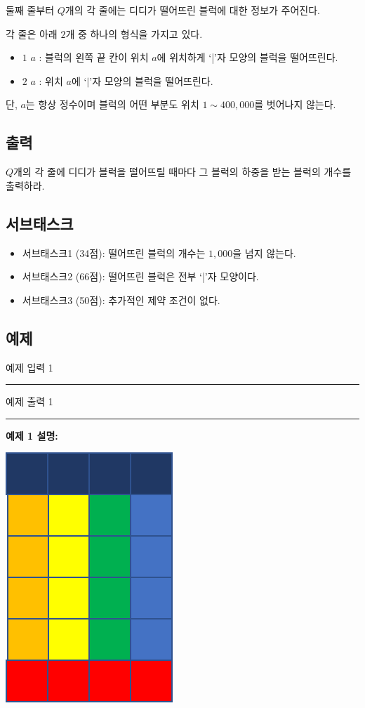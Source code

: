 \documentclass{article}
\def\inputdataname{예제 입력 } %
\def\outputdataname{예제 출력 } %
\newcommand{\iodataNo}[2]{%
	\begin{minipage}{\textwidth}
		\begin{multicols}{2}
			{\inputdataname#2} \\
			\rule{\columnwidth}{1pt}
			
			\columnbreak
			{\outputdataname#2} \\
			\rule{\columnwidth}{1pt}
			
		\end{multicols}
		\vspace{\baselineskip}
	\end{minipage}

}
\begin{document}
둘째 줄부터 $Q$개의 각 줄에는 디디가 떨어뜨린 블럭에 대한 정보가 주어진다.

각 줄은 아래 $2$개 중 하나의 형식을 가지고 있다.

\begin{itemize}
	\item $1$ $a$ : 블럭의 왼쪽 끝 칸이 위치 $a$에 위치하게 `|'자 모양의 블럭을 떨어뜨린다.
	\item $2$ $a$ : 위치 $a$에 `$|$'자 모양의 블럭을 떨어뜨린다.
\end{itemize}
단, $a$는 항상 정수이며 블럭의 어떤 부분도 위치 $1 \sim 400,000$를 벗어나지 않는다.

\subsection{출력}
$Q$개의 각 줄에 디디가 블럭을 떨어뜨릴 때마다 그 블럭의 하중을 받는 블럭의 개수를 출력하라.

\subsection{서브태스크}
\begin{itemize}
	\item 서브태스크1 (34점): 떨어뜨린 블럭의 개수는 $1,000$을 넘지 않는다.
	\item 서브태스크2 (66점): 떨어뜨린 블럭은 전부 `|'자 모양이다.
	\item 서브태스크3 (50점): 추가적인 제약 조건이 없다.
\end{itemize}

\subsection{예제}

\iodataNo{tet1}{1}

\textbf{예제 1 설명:}\newline

\begin{center}
	\includegraphics[scale=0.27]{images/04.png}
\end{center}
\end{document}
